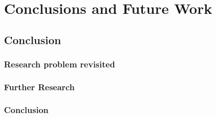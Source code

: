 \chapter{Conclusions and Future Work}

\section{Conclusion}
\subsection{Research problem revisited}
\subsection{Further Research}
\subsection{Conclusion}
